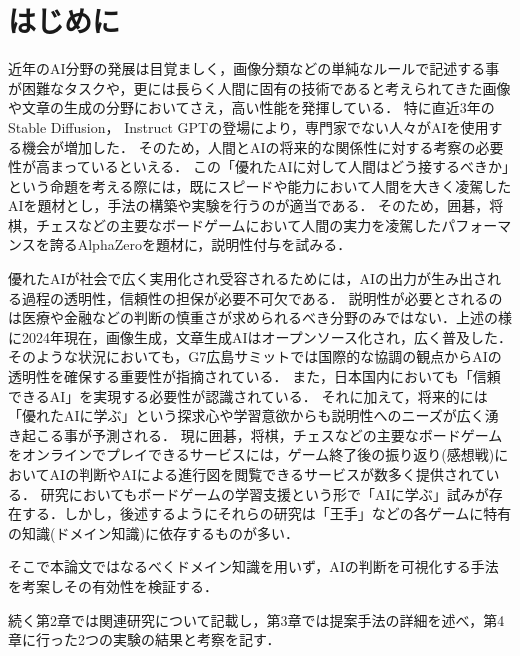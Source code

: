 \chapter{はじめに}
近年のAI分野の発展は目覚ましく，画像分類などの単純なルールで記述する事が困難なタスクや，更には長らく人間に固有の技術であると考えられてきた画像や文章の生成の分野においてさえ，高い性能を発揮している\cite{cat}．
特に直近3年のStable Diffusion\cite{diffusion}， Instruct GPT\cite{GPT}の登場により，専門家でない人々がAIを使用する機会が増加した．
そのため，人間とAIの将来的な関係性に対する考察の必要性が高まっているといえる．
この「優れたAIに対して人間はどう接するべきか」という命題を考える際には，既にスピードや能力において人間を大きく凌駕したAIを題材とし，手法の構築や実験を行うのが適当である．
そのため，囲碁，将棋，チェスなどの主要なボードゲームにおいて人間の実力を凌駕したパフォーマンスを誇るAlphaZeroを題材に，説明性付与を試みる．

優れたAIが社会で広く実用化され受容されるためには，AIの出力が生み出される過程の透明性，信頼性の担保が必要不可欠である．
説明性が必要とされるのは医療や金融などの判断の慎重さが求められるべき分野のみではない．上述の様に2024年現在，画像生成，文章生成AIはオープンソース化され，広く普及した．
そのような状況においても，G7広島サミットでは国際的な協調の観点からAIの透明性を確保する重要性が指摘されている\cite{Hiroshima}．
また，日本国内においても「信頼できるAI」を実現する必要性が認識されている\cite{グランドデザイン}．
それに加えて，将来的には「優れたAIに学ぶ」という探求心や学習意欲からも説明性へのニーズが広く湧き起こる事が予測される．
現に囲碁，将棋，チェスなどの主要なボードゲームをオンラインでプレイできるサービスには，ゲーム終了後の振り返り(感想戦)においてAIの判断やAIによる進行図を閲覧できるサービスが数多く提供されている\cite{panda}\cite{wars}．
研究においてもボードゲームの学習支援という形で「AIに学ぶ」試みが存在する．しかし，後述するようにそれらの研究は「王手」などの各ゲームに特有の知識(ドメイン知識)に依存するものが多い．

そこで本論文ではなるべくドメイン知識を用いず，AIの判断を可視化する手法を考案しその有効性を検証する．

続く第2章では関連研究について記載し，第3章では提案手法の詳細を述べ，第4章に行った2つの実験の結果と考察を記す．

